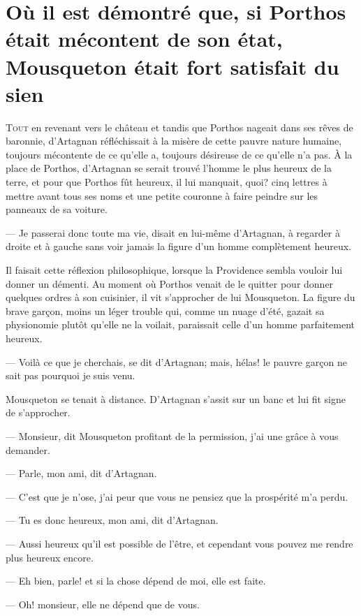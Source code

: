 \chapter[Mousqueton était fort satisfait de son état]{Où il est démontré que, si Porthos était mécontent de son état, Mousqueton était fort satisfait du sien}


\lettrine{T}{out} en revenant vers le château et tandis que Porthos nageait dans ses rêves de baronnie, d'Artagnan réfléchissait à la misère de cette pauvre nature humaine, toujours mécontente de ce qu'elle a, toujours désireuse de ce qu'elle n'a pas. À la place de Porthos, d'Artagnan se serait trouvé l'homme le plus heureux de la terre, et pour que Porthos fût heureux, il lui manquait, quoi? cinq lettres à mettre avant tous ses noms et une petite couronne à faire peindre sur les panneaux de sa voiture.

— Je passerai donc toute ma vie, disait en lui-même d'Artagnan, à regarder à droite et à gauche sans voir jamais la figure d'un homme complètement heureux.

Il faisait cette réflexion philosophique, lorsque la Providence sembla vouloir lui donner un démenti. Au moment où Porthos venait de le quitter pour donner quelques ordres à son cuisinier, il vit s'approcher de lui Mousqueton. La figure du brave garçon, moins un léger trouble qui, comme un nuage d'été, gazait sa physionomie plutôt qu'elle ne la voilait, paraissait celle d'un homme parfaitement heureux.

— Voilà ce que je cherchais, se dit d'Artagnan; mais, hélas! le pauvre garçon ne sait pas pourquoi je suis venu.

Mousqueton se tenait à distance. D'Artagnan s'assit sur un banc et lui fit signe de s'approcher.

— Monsieur, dit Mousqueton profitant de la permission, j'ai une grâce à vous demander.

— Parle, mon ami, dit d'Artagnan.

— C'est que je n'ose, j'ai peur que vous ne pensiez que la prospérité m'a perdu.

— Tu es donc heureux, mon ami, dit d'Artagnan.

— Aussi heureux qu'il est possible de l'être, et cependant vous pouvez me rendre plus heureux encore.

— Eh bien, parle! et si la chose dépend de moi, elle est faite.

— Oh! monsieur, elle ne dépend que de vous.

